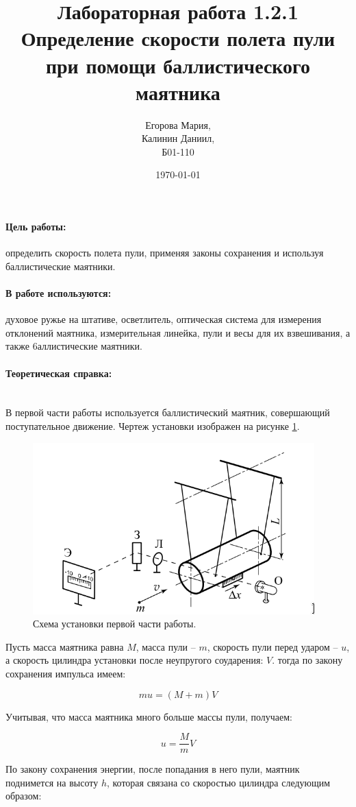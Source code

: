 \documentclass[a4paper, 12pt]{article}
\author{Егорова Мария,\\Калинин Даниил,\\Б01-110}
\date{\today}
\title{Лабораторная работа 1.2.1\\Определение скорости полета пули при помощи баллистического маятника}
\newcommand{\parag}[1]{\paragraph*{#1:}}
\begin{document}
\maketitle

\parag {Цель работы}
определить скорость полета пули, применяя законы
сохранения и используя баллистические маятники.
   
\parag {В работе используются}
духовое ружье на штативе, осветлитель, оптическая система для измерения отклонений маятника, измерительная линейка, пули и весы для их взвешивания, а также 6аллистические маятники.

\parag {Теоретическая справка} ~\\
В первой части работы используется баллистический маятник, совершающий поступательное движение. Чертеж установки изображен на рисунке \ref{pic:pend1}.

\begin{figure}[H]
    \centering
    \includegraphics[width=0.8\linewidth]{pendulum1.png}
    \caption{Схема установки первой части работы.}
    \label{pic:pend1}
\end{figure}

Пусть масса маятника равна $M$, масса пули -- $m$, скорость пули перед ударом -- $u$, а скорость цилиндра установки после неупругого соударения: $V$. тогда по закону сохранения импульса имеем:

\begin{equation}
    mu = \left(M + m\right) V    
\end{equation}

Учитывая, что масса маятника много больше массы пули, получаем:

\begin{equation}
    u = \frac{M}{m}V
\end{equation}

По закону сохранения энергии, после попадания в него пули, маятник поднимется на высоту $h$, которая связана со скоростью цилиндра следующим образом:
\end{document}
